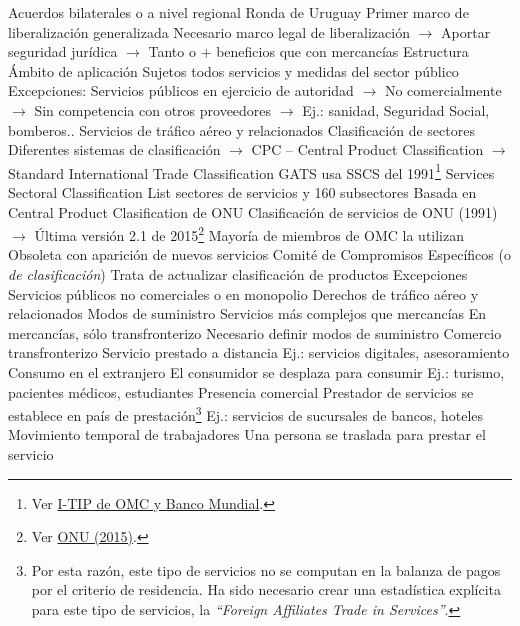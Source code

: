 \documentclass{nuevotema}
\begin{document}
\begin{esquemal}
				\4 Acuerdos bilaterales o a nivel regional
			\3 Ronda de Uruguay
				\4 Primer marco de liberalización generalizada
				\4 Necesario marco legal de liberalización
				\4[] $\to$ Aportar seguridad jurídica
				\4[] $\to$ Tanto o + beneficios que con mercancías
		\2 Estructura
			\3 Ámbito de aplicación
				\4 Sujetos todos servicios y medidas del sector público
				\4 Excepciones:
				\4[] Servicios públicos en ejercicio de autoridad
				\4[] $\to$ No comercialmente
				\4[] $\to$ Sin competencia con otros proveedores
				\4[] $\to$ Ej.: sanidad, Seguridad Social, bomberos..
				\4[] Servicios de tráfico aéreo y relacionados
				\4 Clasificación de sectores
				\4[] Diferentes sistemas de clasificación
				\4[] $\to$ CPC -- Central Product Classification
				\4[] $\to$ Standard International Trade Classification
				\4 GATS usa SSCS del 1991\footnote{Ver \href{http://i-tip.wto.org/services/default.aspx}{I-TIP de OMC y Banco Mundial}.}
				\4[] Services Sectoral Classification List
				 sectores de servicios y 160 subsectores
				\4[$\to$] Basada en Central Product Clasification de ONU
				\4[] Clasificación de servicios de ONU (1991)
				\4[] $\to$ Última versión 2.1 de 2015\footnote{Ver \href{https://unstats.un.org/unsd/classifications/unsdclassifications/cpcv21.pdf}{ONU (2015)}.}
				\4[] Mayoría de miembros de OMC la utilizan
				\4[] Obsoleta con aparición de nuevos servicios
				\4 Comité de Compromisos Específicos
				\4[] (o \textit{de clasificación})
				\4[] Trata de actualizar clasificación de productos
				\4 Excepciones
				\4[] Servicios públicos no comerciales o en monopolio
				\4[] Derechos de tráfico aéreo y relacionados
			\3 Modos de suministro
				\4 Servicios más complejos que mercancías
				\4[$\to$] En mercancías, sólo transfronterizo
				\4 Necesario definir modos de suministro
				\4[1] Comercio transfronterizo
				\4[] Servicio prestado a distancia
				\4[] Ej.: servicios digitales, asesoramiento
				\4[2] Consumo en el extranjero
				\4[] El consumidor se desplaza para consumir
				\4[] Ej.: turismo, pacientes médicos, estudiantes
				\4[3] Presencia comercial
				\4[] Prestador de servicios se establece en país de prestación\footnote{Por esta razón, este tipo de servicios no se computan en la balanza de pagos por el criterio de residencia. Ha sido necesario crear una estadística explícita para este tipo de servicios, la \textit{``Foreign Affiliates Trade in Services''}.}
				\4[] Ej.: servicios de sucursales de bancos, hoteles
				\4[4] Movimiento temporal de trabajadores
				\4[] Una persona se traslada para prestar el servicio

\end{esquemal}
\end{document}
